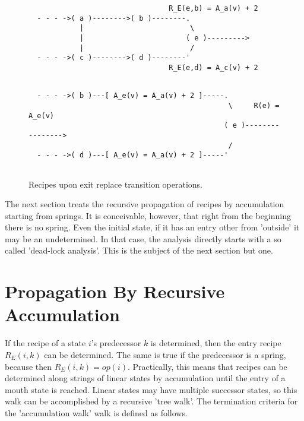 \documentclass[12pt,a4paper]{scrartcl}
\begin{document}
\begin{figure}[htbp] \leavevmode \label{fig:interference-example}
\begin{verbatim}
                                 R_E(e,b) = A_a(v) + 2
  - - - ->( a )-------->( b )--------.
            |                         \
            |                        ( e )--------->
            |                         /
  - - - ->( c )-------->( d )--------'
                                 R_E(e,d) = A_c(v) + 2

\end{verbatim}
\begin{verbatim}
                                 
  - - - ->( b )---[ A_e(v) = A_a(v) + 2 ]-----.
                                               \     R(e) = A_e(v)
                                              ( e )---------------->
                                               /
  - - - ->( d )---[ A_e(v) = A_a(v) + 2 ]-----'
                                 

\end{verbatim}
\caption{Recipes upon exit replace transition operations.}
\end{figure}
The next section treats the recursive propagation of recipes by accumulation
starting from springs.  It is conceivable, however, that right from the
beginning there is no spring.  Even the initial state, if it has an entry other
from 'outside' it may be an undetermined.  In that case, the analysis directly
starts with a so called 'dead-lock analysis'. This is the subject of the next
section but one.

%
\section{Propagation By Recursive Accumulation}

If the recipe of a state $i$'s predecessor $k$ is determined, then the entry
recipe $R_E(i,k)$ can be determined. The same is true if the predecessor is a
spring, because then $R_E(i,k) = op(i)$. Practically, this means that recipes
can be determined along strings of linear states by accumulation until the
entry of a mouth state is reached. Linear states may have multiple successor
states, so this walk can be accomplished by a recursive 'tree walk'.  The
termination criteria for the 'accumulation walk' walk is defined as follows.
\end{document}
